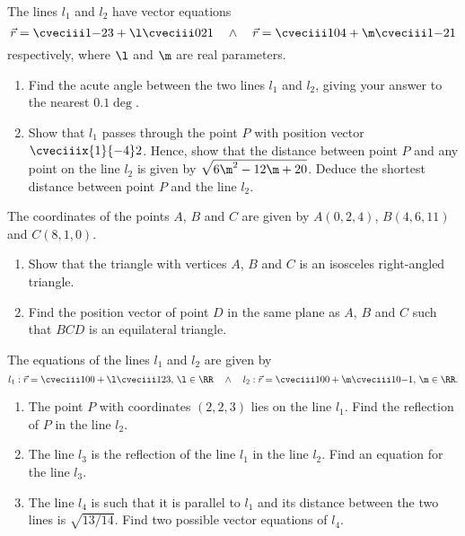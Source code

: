 \begin{problem}
    The lines $l_1$ and $l_2$ have vector equations \[\vec r = \cveciii1{-2}3 + \l \cveciii021 \quad \land \quad \vec r = \cveciii104 + \m \cveciii1{-2}1\] respectively, where $\l$ and $\m$ are real parameters.

    \begin{enumerate}
        \item Find the acute angle between the two lines $l_1$ and $l_2$, giving your answer to the nearest $0.1\deg$.
        \item Show that $l_1$ passes through the point $P$ with position vector $\cveciiix{1}{-4}2$. Hence, show that the distance between point $P$ and any point on the line $l_2$ is given by $\sqrt{6\m^2 - 12\m + 20}$. Deduce the shortest distance between point $P$ and the line $l_2$.
    \end{enumerate}
\end{problem}

\begin{problem}[\chili]
    The coordinates of the points $A$, $B$ and $C$ are given by $A(0, 2, 4)$, $B(4, 6, 11)$ and $C(8, 1, 0)$.
    
    \begin{enumerate}
        \item Show that the triangle with vertices $A$, $B$ and $C$ is an isosceles right-angled triangle.
        \item Find the position vector of point $D$ in the same plane as $A$, $B$ and $C$ such that $BCD$ is an equilateral triangle.
    \end{enumerate}
\end{problem}

\begin{problem}[\chili]
    The equations of the lines $l_1$ and $l_2$ are given by \[l_1: \vec r = \cveciii100 + \l \cveciii123, \, \l \in \RR \quad \land \quad l_2: \vec r = \cveciii100 + \m \cveciii10{-1}, \, \m \in \RR.\]

    \begin{enumerate}
        \item The point $P$ with coordinates $(2, 2, 3)$ lies on the line $l_1$. Find the reflection of $P$ in the line $l_2$.
        \item The line $l_3$ is the reflection of the line $l_1$ in the line $l_2$. Find an equation for the line $l_3$.
        \item The line $l_4$ is such that it is parallel to $l_1$ and its distance between the two lines is $\sqrt{13/14}$. Find two possible vector equations of $l_4$.
    \end{enumerate}
\end{problem}